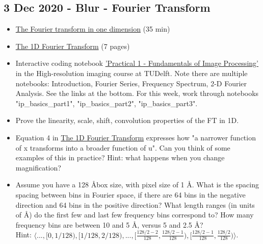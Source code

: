 \documentclass[11pt, oneside]{article}   	%
\begin{document}
\subsection{3 Dec 2020 - Blur - Fourier Transform}
\begin{itemize}
	\item \href{https://youtu.be/27bNryOu84g}{The Fourier transform in one dimension} (35 min)
	\item \href{https://cryoemprinciples.yale.edu/sites/default/files/files/3%20Fourier1D.pdf}{The 1D Fourier Transform} (7 pages)
	\item Interactive coding notebook \href{https://gitlab.tudelft.nl/aj-lab/teaching/-/wikis/NB4020}{'Practical 1 - Fundamentals of Image Processing'} in the High-resolution imaging course at TUDelft. Note there are multiple notebooks: Introduction, Fourier Series, Frequency Spectrum, 2-D Fourier Analysis. See the links at the bottom. For this week, work through notebooks "ip\_basics\_part1", "ip\_basics\_part2", "ip\_basics\_part3".
\end{itemize}
\begin{itemize}
	\item Prove the linearity, scale, shift, convolution properties of the FT in 1D.
	\item Equation 4 in \href{https://cryoemprinciples.yale.edu/sites/default/files/files/3%20Fourier1D.pdf}{The 1D Fourier Transform} expresses how "a narrower function of x transforms into a broader function of u". Can you think of some examples of this in practice? Hint: what happens when you change magnification? 
	\item Assume you have a 128 \AA box size, with pixel size of 1 \AA. What is the spacing spacing between bins in Fourier space, if there are 64 bins in the negative direction and 64 bins in the positive direction? What length ranges (in units of \AA) do the first few and last few frequency bins correspond to?  How many frequency bins are between 10 and 5 \AA, versus 5 and 2.5 \AA? \\ Hint: $\langle..., [0,1/128), [1/128,2/128), ... , [\frac{128/2-2}{128}, \frac{128/2-1}{128}),  [\frac{128/2-1}{128}, \frac{128/2}{128})\rangle$.
\end{itemize}
\end{document}
